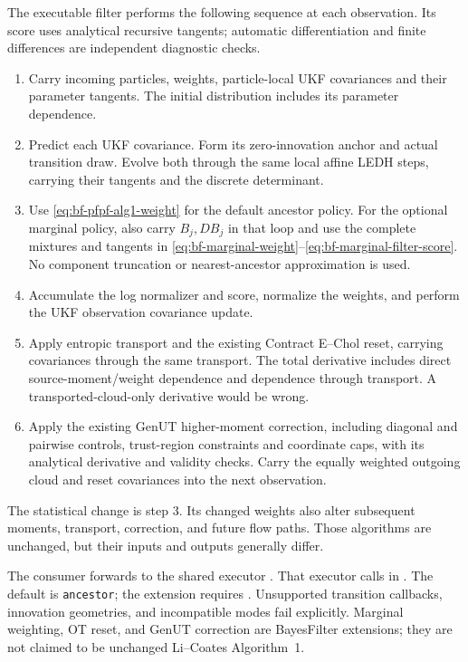 The executable filter performs the following sequence at each observation.
Its score uses analytical recursive tangents; automatic differentiation and
finite differences are independent diagnostic checks.
\begin{enumerate}
 \item Carry incoming particles, weights, particle-local UKF covariances and
 their parameter tangents. The initial distribution includes its parameter
 dependence.
 \item Predict each UKF covariance. Form its zero-innovation anchor and actual
 transition draw. Evolve both through the same local affine LEDH steps, carrying
 their tangents and the discrete determinant.
 \item Use \eqref{eq:bf-pfpf-alg1-weight} for the default ancestor policy.
 For the optional marginal policy, also carry $B_j,DB_j$ in that loop and use
 the complete mixtures and tangents in
 \eqref{eq:bf-marginal-weight}--\eqref{eq:bf-marginal-filter-score}.
 No component truncation or nearest-ancestor approximation is used.
 \item Accumulate the log normalizer and score, normalize the weights, and
 perform the UKF observation covariance update.
 \item Apply entropic transport and the existing Contract E--Chol reset,
 carrying covariances through the same transport. The total derivative includes
 direct source-moment/weight dependence and dependence through transport.
 A transported-cloud-only derivative would be wrong.
 \item Apply the existing GenUT higher-moment correction, including diagonal
 and pairwise controls, trust-region constraints and coordinate caps, with its
 analytical derivative and validity checks. Carry the equally weighted
 outgoing cloud and reset covariances into the next observation.
\end{enumerate}
The statistical change is step 3. Its changed weights also alter subsequent
moments, transport, correction, and future flow paths. Those algorithms are
unchanged, but their inputs and outputs generally differ.

The consumer  forwards
 to the shared executor
. That executor calls
 in
. The default is \texttt{ancestor};
the extension requires . Unsupported transition
callbacks, innovation geometries, and incompatible modes fail explicitly.
Marginal weighting, OT reset, and GenUT correction are BayesFilter extensions;
they are not claimed to be unchanged Li--Coates Algorithm~1.

